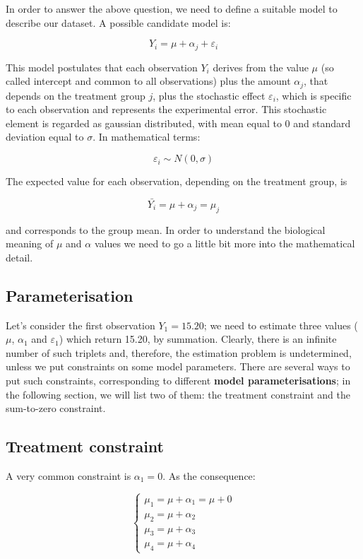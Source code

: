 \documentclass[a4paper,12pt,oneside]{book}
\begin{document}
In order to answer the above question, we need to define a suitable model to describe our dataset. A possible candidate model is:

\[Y_i = \mu + \alpha_j + \varepsilon_i\]

This model postulates that each observation \(Y_i\) derives from the value \(\mu\) (so called intercept and common to all observations) plus the amount \(\alpha_j\), that depends on the treatment group \(j\), plus the stochastic effect \(\varepsilon_i\), which is specific to each observation and represents the experimental error. This stochastic element is regarded as gaussian distributed, with mean equal to 0 and standard deviation equal to \(\sigma\). In mathematical terms:

\[\varepsilon_i \sim N(0, \sigma)\]

The expected value for each observation, depending on the treatment group, is

\[\bar{Y_i} = \mu + \alpha_j = \mu_j\]

and corresponds to the group mean. In order to understand the biological meaning of \(\mu\) and \(\alpha\) values we need to go a little bit more into the mathematical detail.

\hypertarget{parameterisation}{%
\subsection{Parameterisation}\label{parameterisation}}

Let's consider the first observation \(Y_1 = 15.20\); we need to estimate three values (\(\mu\), \(\alpha_1\) and \(\varepsilon_1\)) which return 15.20, by summation. Clearly, there is an infinite number of such triplets and, therefore, the estimation problem is undetermined, unless we put constraints on some model parameters. There are several ways to put such constraints, corresponding to different \textbf{model parameterisations}; in the following section, we will list two of them: the treatment constraint and the sum-to-zero constraint.

\hypertarget{treatment-constraint}{%
\subsection{Treatment constraint}\label{treatment-constraint}}

A very common constraint is \(\alpha_1 = 0\). As the consequence:

\[\left\{ {\begin{array}{l}
\mu_1 = \mu + \alpha_1 = \mu + 0\\
\mu_2 = \mu + \alpha_2 \\
\mu_3 = \mu + \alpha_3 \\
\mu_4 = \mu + \alpha_4
\end{array}} \right.\]
\end{document}
